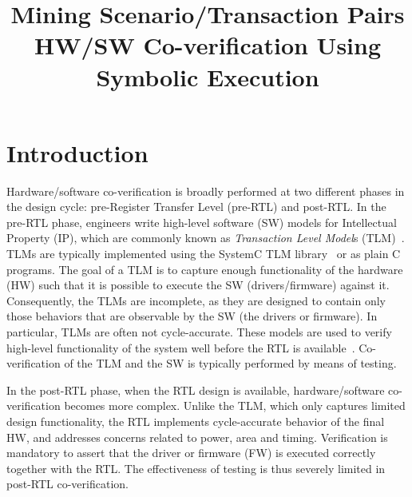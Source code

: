 \documentclass[sigconf]{acmart}
\title{Mining Scenario/Transaction Pairs HW/SW Co-verification Using Symbolic Execution}
\begin{document}
\renewcommand\footnotetextcopyrightpermission[1]{} %
\pagestyle{plain} %

\maketitle

%
\section{Introduction}
%
Hardware/software co-verification is broadly performed at two different
phases in the design cycle: pre-Register Transfer Level (pre-RTL) and 
post-RTL.  In the pre-RTL phase,
engineers write high-level software (SW) models for Intellectual Property (IP), 
which are commonly known as {\em Transaction Level Model}s
(TLM)~\cite{codes14}.  TLMs are typically implemented using the SystemC TLM
library~\cite{tlm} or as plain C programs.  The goal of a TLM is to capture
enough functionality of the hardware (HW) such that it is possible to execute the
SW (drivers/firmware) against it.  Consequently, the TLMs are
incomplete, as they are designed to contain only those behaviors that are
observable by the SW (the drivers or firmware).  In particular, TLMs
are often not cycle-accurate.  These models are used to verify high-level
functionality of the system well before the RTL is
available~\cite{codes14,codes15}. Co-verification of the TLM and the
SW is typically performed by means of testing.

In the post-RTL phase, when the RTL design is available, hardware/software
co-verification becomes more complex.  Unlike the TLM, which only captures
limited design functionality, the RTL implements cycle-accurate behavior
of the final HW, and addresses concerns related to power, area and
timing.  Verification is mandatory to assert that the driver or firmware (FW) 
is executed correctly together with the RTL.  The effectiveness of testing 
is thus severely limited in post-RTL co-verification.
\end{document}
